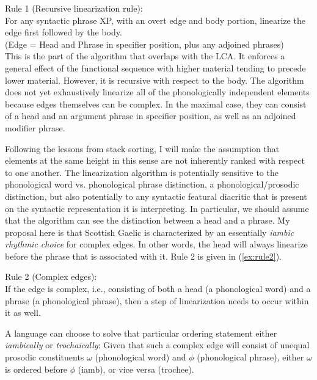 \documentclass[output=paper,colorlinks,citecolor=brown]{langscibook}
\begin{document}
\eanoraggedright\label{ex:rule1}
Rule 1 (Recursive linearization rule):\smallskip\\
For any syntactic phrase XP, with an overt edge and body portion, linearize the edge first followed by the body. \\
(Edge = Head and Phrase in specifier position, plus any adjoined phrases) \\ 
This is the part of the  algorithm that overlaps with the LCA. It enforces a general effect of the functional sequence with higher material tending to precede lower material. However, it is recursive with respect to the body.  
\z
The algorithm does not yet exhaustively linearize all of the phonologically independent elements because  edges themselves can be complex. In the maximal case, they can consist of a head and an argument phrase in specifier position, as well as an adjoined  modifier phrase.

Following the lessons from stack sorting, I will make the assumption that elements at the same height in this sense are not inherently ranked with respect to one another. The linearization algorithm is potentially sensitive to the phonological word vs. phonological phrase distinction, a phonological\slash prosodic distinction, but also potentially to any syntactic featural diacritic that is present on the syntactic representation it is interpreting. In particular, we should assume that the algorithm can see the distinction between a head and a phrase.   My proposal here is that Scottish Gaelic is characterized by an essentially \textit{iambic rhythmic choice} for complex edges. In other words, the head will always linearize before the phrase that is associated with it. Rule 2 is given in (\ref{ex:rule2}).  

\eanoraggedright
\label{ex:rule2}
Rule 2  (Complex edges):\smallskip\\ 
If the edge is complex, i.e., consisting of both a head (a phonological word) and a phrase (a phonological phrase), then a step of linearization needs to occur within it as well.
\z

A language can choose to solve that particular ordering statement either  \textit{iambically} or \textit{trochaically}:  Given that such a complex edge will consist of unequal prosodic constituents $\omega$ (phonological word) and $\phi$ (phonological phrase), either $\omega$ is ordered before $\phi$ (iamb), or vice versa (trochee). 
\end{document}
